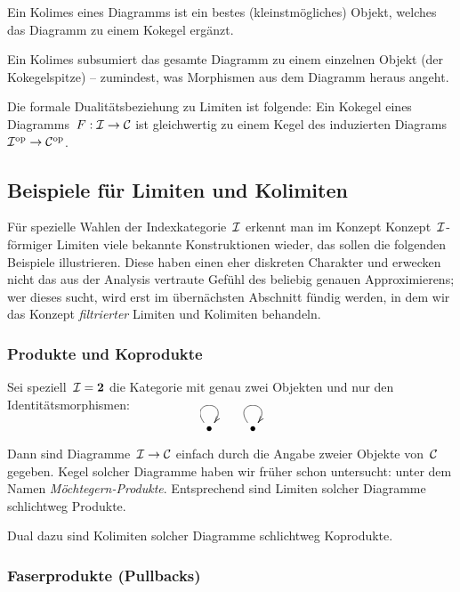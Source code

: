 \begin{motto}Ein Kolimes eines Diagramms ist ein bestes
(kleinstmögliches) Objekt, welches das Diagramm zu einem Kokegel ergänzt.
\end{motto}

\begin{motto}
Ein Kolimes subsumiert das gesamte Diagramm zu einem einzelnen Objekt (der
Kokegelspitze) -- zumindest, was Morphismen aus dem Diagramm heraus
angeht.\end{motto}

\begin{bem}Die formale Dualitätsbeziehung zu Limiten ist folgende: Ein Kokegel eines
Diagramms~$F : \mathcal{I} \to \mathcal{C}$ ist gleichwertig zu einem Kegel des induzierten
Diagrams~$\mathcal{I}^{\mathrm{op}} \to \mathcal{C}^{\mathrm{op}}$.\end{bem}


\subsection{Beispiele für Limiten und Kolimiten}

Für spezielle Wahlen der Indexkategorie~$\mathcal{I}$ erkennt man im Konzept
Konzept~$\mathcal{I}$-förmiger Limiten viele bekannte Konstruktionen wieder, das sollen
die folgenden Beispiele illustrieren. Diese haben einen eher diskreten Charakter
und erwecken nicht das aus der Analysis vertraute Gefühl des beliebig genauen
Approximierens; wer dieses sucht, wird erst im übernächsten Abschnitt fündig
werden, in dem wir das Konzept \emph{filtrierter} Limiten und Kolimiten
behandeln.


\subsubsection*{Produkte und Koprodukte}

Sei speziell~$\mathcal{I} = \mathbf{2}$ die Kategorie mit genau zwei Objekten und nur
den Iden\-ti\-täts\-mor\-phis\-men:
\[ \xymatrix{\bullet \ar@(ul,ur) & \bullet \ar@(ul,ur)} \]
Dann sind Diagramme~$\mathcal{I} \to \mathcal{C}$ einfach durch die Angabe zweier Objekte
von~$\mathcal{C}$ gegeben. Kegel solcher Diagramme haben wir früher schon untersucht:
unter dem Namen \emph{Möchtegern-Produkte}. Entsprechend sind Limiten
solcher Diagramme schlichtweg Produkte.

Dual dazu sind Kolimiten solcher Diagramme schlichtweg Koprodukte.


\subsubsection*{Faserprodukte (Pullbacks)}

